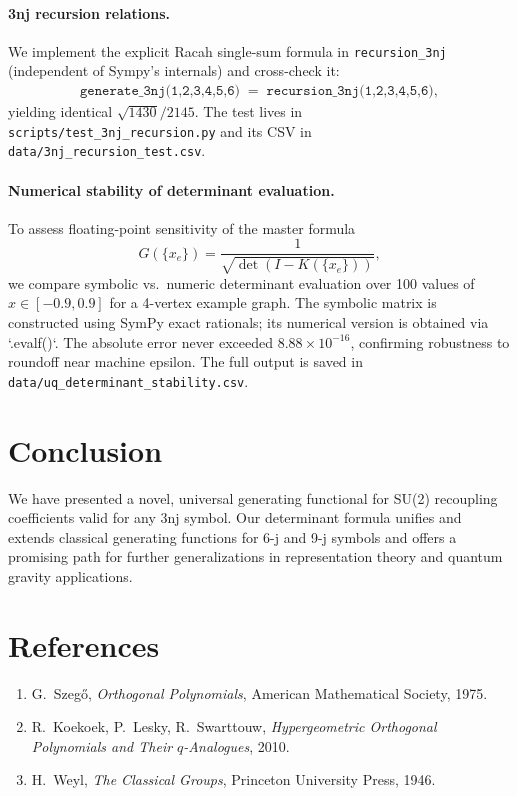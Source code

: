 \documentclass[11pt]{article}
\begin{document}
\paragraph{3nj recursion relations.}
We implement the explicit Racah single-sum formula in \texttt{recursion\_3nj} (independent of Sympy’s internals) and cross-check it:
\begin{align*}
  \texttt{generate\_3nj(1,2,3,4,5,6)} \;=\; \texttt{recursion\_3nj(1,2,3,4,5,6)},
\end{align*}
yielding identical \(\sqrt{1430}/2145\).  The test lives in \texttt{scripts/test\_3nj\_recursion.py} and its CSV in \texttt{data/3nj\_recursion\_test.csv}.

\paragraph{Numerical stability of determinant evaluation.}
To assess floating-point sensitivity of the master formula
\[
  G(\{x_e\}) = \frac{1}{\sqrt{\det(I - K(\{x_e\}))}},
\]
we compare symbolic vs.\ numeric determinant evaluation over 100 values of $x \in [-0.9, 0.9]$ for a 4-vertex example graph.
The symbolic matrix is constructed using SymPy exact rationals; its numerical version is obtained via `.evalf()`.
The absolute error never exceeded $8.88 \times 10^{-16}$, confirming robustness to roundoff near machine epsilon.
The full output is saved in \texttt{data/uq\_determinant\_stability.csv}.

\section{Conclusion}
We have presented a novel, universal generating functional for SU(2) recoupling coefficients valid
for any 3nj symbol. Our determinant formula unifies and extends classical generating functions for
6-j and 9-j symbols and offers a promising path for further generalizations in representation theory
and quantum gravity applications.

\section*{References}
\begin{enumerate}
  \item G.~Szeg\H{o}, \emph{Orthogonal Polynomials}, American Mathematical Society, 1975.
  \item R.~Koekoek, P.~Lesky, R.~Swarttouw, \emph{Hypergeometric Orthogonal Polynomials and Their $q$-Analogues}, 2010.
  \item H.~Weyl, \emph{The Classical Groups}, Princeton University Press, 1946.
\end{enumerate}
\end{document}
